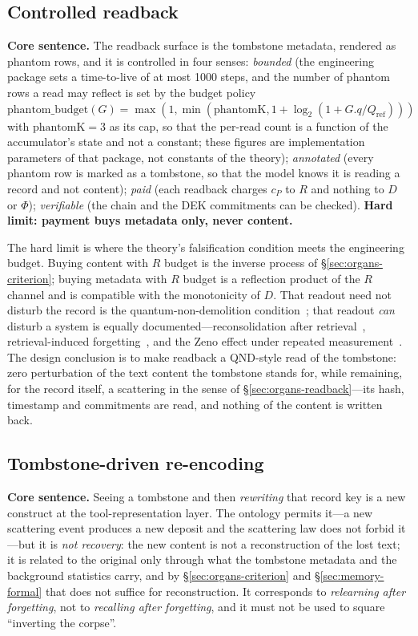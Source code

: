 \documentclass[11pt,a4paper]{article}
\begin{document}
\subsection{Controlled readback}
\label{sec:memory-readback}

\textbf{Core sentence.} The readback surface is the tombstone metadata, rendered as phantom rows, and it is controlled in four senses: \emph{bounded} (the engineering package sets a time-to-live of at most 1000 steps, and the number of phantom rows a read may reflect is set by the budget policy $\mathrm{phantom\_budget}(G)=\max(1,\min(\mathrm{phantomK},1+\log_2(1+G.q/Q_{\mathrm{ref}})))$ with $\mathrm{phantomK}=3$ as its cap, so that the per-read count is a function of the accumulator's state and not a constant; these figures are implementation parameters of that package, not constants of the theory); \emph{annotated} (every phantom row is marked as a tombstone, so that the model knows it is reading a record and not content); \emph{paid} (each readback charges $c_P$ to $R$ and nothing to $D$ or $\Phi$); \emph{verifiable} (the chain and the DEK commitments can be checked). \textbf{Hard limit: payment buys metadata only, never content.}

The hard limit is where the theory's falsification condition meets the engineering budget. Buying content with $R$ budget is the inverse process of \S\ref{sec:organs-criterion}; buying metadata with $R$ budget is a reflection product of the $R$ channel and is compatible with the monotonicity of $D$. That readout need not disturb the record is the quantum-non-demolition condition~\cite{caves1980,braginsky1992}; that readout \emph{can} disturb a system is equally documented---reconsolidation after retrieval~\cite{nader2000}, retrieval-induced forgetting~\cite{anderson1994}, and the Zeno effect under repeated measurement~\cite{misra1977,itano1990}. The design conclusion is to make readback a QND-style read of the tombstone: zero perturbation of the text content the tombstone stands for, while remaining, for the record itself, a scattering in the sense of \S\ref{sec:organs-readback}---its hash, timestamp and commitments are read, and nothing of the content is written back.

\subsection{Tombstone-driven re-encoding}
\label{sec:memory-reencode}

\textbf{Core sentence.} Seeing a tombstone and then \emph{rewriting} that record key is a new construct at the tool-representation layer. The ontology permits it---a new scattering event produces a new deposit and the scattering law does not forbid it---but it is \emph{not recovery}: the new content is not a reconstruction of the lost text; it is related to the original only through what the tombstone metadata and the background statistics carry, and by \S\ref{sec:organs-criterion} and \S\ref{sec:memory-formal} that does not suffice for reconstruction. It corresponds to \emph{relearning after forgetting}, not to \emph{recalling after forgetting}, and it must not be used to square ``inverting the corpse''.
\end{document}
